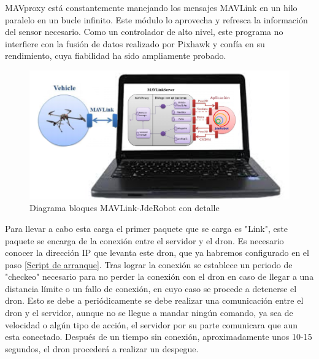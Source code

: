 MAVproxy está constantemente manejando los mensajes MAVLink en un hilo paralelo en un bucle infinito. Este módulo lo aprovecha y refresca la información del sensor necesario. Como un controlador de alto nivel, este programa no interfiere con la fusión de datos realizado por Pixhawk y confía en su rendimiento, cuya fiabilidad ha sido ampliamente probado.

\begin{figure}[H]
  \centering 
  \hspace*{-2.5cm}     
  \includegraphics[scale=0.55]{imagenes/cajaTransparente.png}
  \caption{Diagrama bloques MAVLink-JdeRobot con detalle}
  \label{fig:mavLinkJdeRobotTrasparente}
\end{figure}


Para llevar a cabo esta carga el primer paquete que se carga es "Link", este paquete se encarga de la conexión entre el servidor y el dron. Es necesario conocer la dirección IP que levanta este dron, que ya habremos configurado en el paso \ref{Script de arranque}. Tras lograr la conexión se establece un periodo de "checkeo" necesario para no perder la conexión con el dron en caso de llegar a una distancia límite o un fallo de conexión, en cuyo caso se procede a detenerse el dron. Esto se debe a periódicamente se debe realizar una comunicación entre el dron y el servidor, aunque no se llegue a mandar ningún comando, ya sea de velocidad o algún tipo de acción, el servidor por su parte comunicara que aun esta conectado. Después de un tiempo sin conexión, aproximadamente unos 10-15 segundos, el dron procederá a realizar un despegue. 



